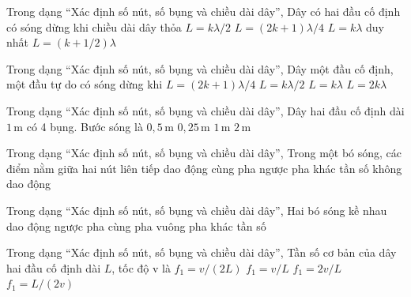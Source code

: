 \begin{ex}
Trong dạng “Xác định số nút, số bụng và chiều dài dây”, Dây có hai đầu cố định có sóng dừng khi chiều dài dây thỏa
\choice
{\True $L=k\lambda/2$}
{$L=(2k+1)\lambda/4$}
{$L=k\lambda$ duy nhất}
{$L=(k+1/2)\lambda$}
\end{ex}

\begin{ex}
Trong dạng “Xác định số nút, số bụng và chiều dài dây”, Dây một đầu cố định, một đầu tự do có sóng dừng khi
\choice
{\True $L=(2k+1)\lambda/4$}
{$L=k\lambda/2$}
{$L=k\lambda$}
{$L=2k\lambda$}
\end{ex}

\begin{ex}
Trong dạng “Xác định số nút, số bụng và chiều dài dây”, Dây hai đầu cố định dài $1\,\text{m}$ có 4 bụng. Bước sóng là
\choice
{\True $0,5\,\text{m}$}
{$0,25\,\text{m}$}
{$1\,\text{m}$}
{$2\,\text{m}$}
\end{ex}

\begin{ex}
Trong dạng “Xác định số nút, số bụng và chiều dài dây”, Trong một bó sóng, các điểm nằm giữa hai nút liên tiếp dao động
\choice
{\True cùng pha}
{ngược pha}
{khác tần số}
{không dao động}
\end{ex}

\begin{ex}
Trong dạng “Xác định số nút, số bụng và chiều dài dây”, Hai bó sóng kề nhau dao động
\choice
{\True ngược pha}
{cùng pha}
{vuông pha}
{khác tần số}
\end{ex}

\begin{ex}
Trong dạng “Xác định số nút, số bụng và chiều dài dây”, Tần số cơ bản của dây hai đầu cố định dài $L$, tốc độ v là
\choice
{\True $f_1=v/(2L)$}
{$f_1=v/L$}
{$f_1=2v/L$}
{$f_1=L/(2v)$}
\end{ex}

